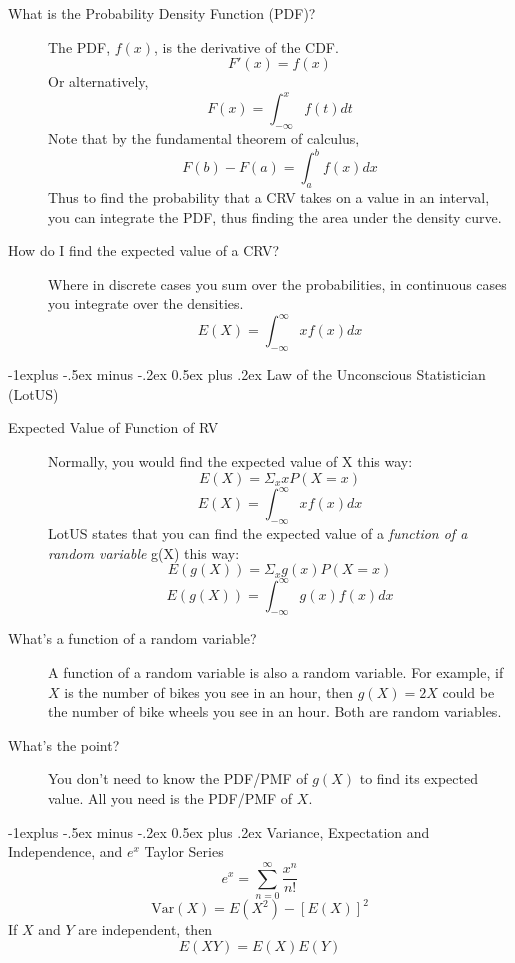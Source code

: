 \documentclass[10pt,landscape]{article}
\makeatletter
\theoremstyle{definition}
\newcommand{\var}{\textrm{Var}}
\renewcommand{\subsection}{\@startsection{subsection}{2}{0mm}%
                                {-1explus -.5ex minus -.2ex}%
                                {0.5ex plus .2ex}%
                                {\normalfont\normalsize\bfseries}}
\makeatother
\begin{document}
\begin{multicols}{3}
\begin{description}
\item[What is the Probability Density Function (PDF)?] The PDF, $f(x)$, is the derivative of the CDF. 
\[ F'(x) = f(x) \]
Or alternatively,
\[ F(x) = \int_{-\infty}^x f(t)dt \]
Note that by the fundamental theorem of calculus,
\[ F(b) - F(a) = \int^b_a f(x)dx \]
Thus to find the probability that a CRV takes on a value in an interval, you can integrate the PDF, thus finding the area under the density curve.

\item[How do I find the expected value of a CRV?] Where in discrete cases you sum over the probabilities, in continuous cases you integrate over the densities.
\[E(X) = \int^\infty_{-\infty}xf(x)dx \]
\end{description}


\subsection{Law of the Unconscious Statistician (LotUS)}
\begin{description}
\item[Expected Value of Function of RV]
Normally, you would find the expected value of X this way:
\[E(X) = \Sigma_x xP(X=x) \]
\[E(X) = \int^\infty_{-\infty}xf(x)dx \]
LotUS states that you can find the expected value of a \emph{function of a random variable} g(X) this way:
\[E(g(X)) = \Sigma_x g(x)P(X=x) \]
\[E(g(X)) = \int^\infty_{-\infty}g(x)f(x)dx \]
\item[What's a function of a random variable?] A function of a random variable is also a random variable. For example, if $X$ is the number of bikes you see in an hour, then $g(X) =  2X$ could be the number of bike wheels you see in an hour. Both are random variables.
\item[What's the point?] You don't need to know the PDF/PMF of $g(X)$ to find its expected value. All you need is the PDF/PMF of $X$. 
\end{description}

\subsection{Variance, Expectation and Independence, and $e^x$ Taylor Series}
\[e^x = \sum_{n=0}^\infty \frac{x^n}{n!}\]
\[\var(X) = E(X^2) - [E(X)]^2\]
If $X$ and $Y$ are independent, then
\[E(XY) = E(X)E(Y)\]



\end{multicols}
\end{document}
